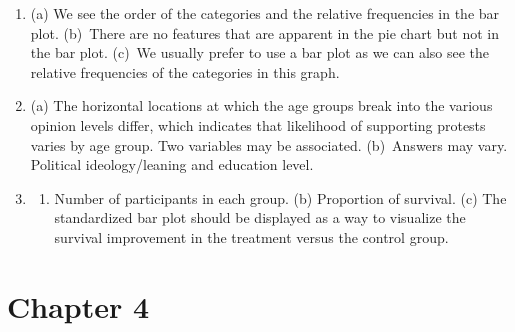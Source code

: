 \documentclass[
  10pt,
  openany]{book}
\providecommand{\tightlist}{%
  \setlength{\itemsep}{0pt}\setlength{\parskip}{0pt}}
\begin{document}
\begin{enumerate}
\def\labelenumi{\arabic{enumi}.}
\item
  (a) We see the order of the categories and the relative frequencies in the bar plot. (b)~There are no features that are apparent in the pie chart but not in the bar plot. (c)~We usually prefer to use a bar plot as we can also see the relative frequencies of the categories in this graph.

  \addtocounter{enumi}{1}
\item
  (a) The horizontal locations at which the age groups break into the various opinion levels differ, which indicates that likelihood of supporting protests varies by age group. Two variables may be associated. (b)~Answers may vary. Political ideology/leaning and education level.

  \addtocounter{enumi}{1}
\item
  \begin{enumerate}
  \def\labelenumii{(\alph{enumii})}
  \tightlist
  \item
    Number of participants in each group. (b) Proportion of survival. (c) The standardized bar plot should be displayed as a way to visualize the survival improvement in the treatment versus the control group.

    \addtocounter{enumi}{1}
  \end{enumerate}
\end{enumerate}

\hypertarget{exercise-solutions-05}{%
\section{Chapter 4}\label{exercise-solutions-05}}
\end{document}
